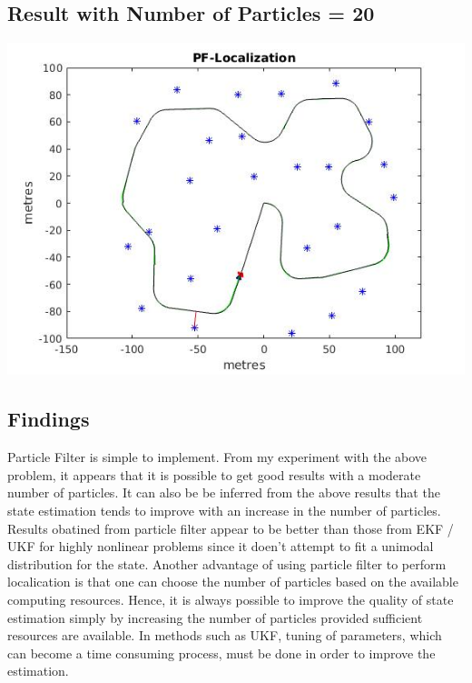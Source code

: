 \documentclass[a4paper,fleqn,11pt]{article}
\theoremstyle{mytheor}
\begin{document}
\subsection{Result with Number of Particles = 20}

\begin{center}
\includegraphics[scale = 0.74]{../images/PF-num20.jpg} \\
\end{center}

\subsection*{Findings}

Particle Filter is simple to implement. From my experiment with the above problem, it appears that it is possible to get good results with a moderate number of particles. It can also be be inferred from the above results that the state estimation tends to improve with an increase in the number of particles. Results obatined from particle filter appear to be better than those from EKF / UKF for highly nonlinear problems since it doen't attempt to fit a unimodal distribution for the state. Another advantage of using particle filter to perform localication is that one can choose the number of particles based on the available computing resources. Hence, it is always possible to improve the quality of state estimation simply by increasing the number of particles provided sufficient resources are available. In methods such as UKF, tuning of parameters, which can become a time consuming process, must be done in order to improve the estimation.
\end{document}
